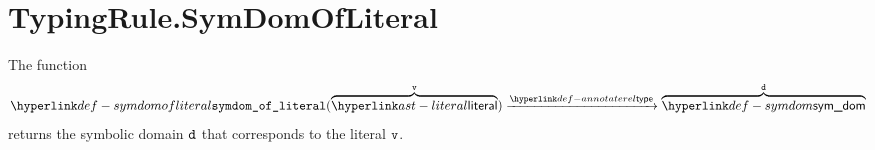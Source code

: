 \begin{mathpar}
\end{mathpar}

\section{TypingRule.SymDomOfLiteral \label{sec:TypingRule.SymDomOfLiteral}}
\hypertarget{def-symdomofliteral}{}
The function
\[
\symdomofliteral(\overname{\literal}{\vv}) \typearrow \overname{\symdom}{\vd}
\]
returns the symbolic domain $\vd$ that corresponds to the literal $\vv$.

